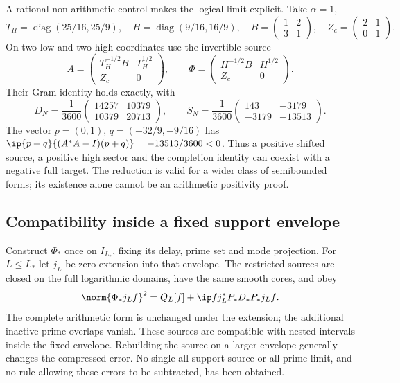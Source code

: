 A rational non-arithmetic control makes the logical limit explicit.
Take $\alpha=1$,
\[
T_H=\operatorname{diag}(25/16,25/9),\quad
H=\operatorname{diag}(9/16,16/9),\quad
B=\begin{pmatrix}1&2\\3&1\end{pmatrix},\quad
Z_c=\begin{pmatrix}2&1\\0&1\end{pmatrix}.
\]
On two low and two high coordinates use the invertible source
\[
A=\begin{pmatrix}T_H^{-1/2}B&T_H^{1/2}\\Z_c&0\end{pmatrix},
\qquad
\Phi=\begin{pmatrix}H^{-1/2}B&H^{1/2}\\Z_c&0\end{pmatrix}.
\]
Their Gram identity holds exactly, with
\[
D_N=\frac1{3600}
\begin{pmatrix}14257&10379\\10379&20713\end{pmatrix},\qquad
S_N=\frac1{3600}
\begin{pmatrix}143&-3179\\-3179&-13513\end{pmatrix}.
\]
The vector $p=(0,1)$, $q=(-32/9,-9/16)$ has
$\ip{p+q}{(A^*A-I)(p+q)}=-13513/3600<0$.
Thus a positive shifted source, a positive high sector and the
completion identity can coexist with a negative full target.
The reduction is valid for a wider class of semibounded forms;
its existence alone cannot be an arithmetic positivity proof.

\subsection{Compatibility inside a fixed support envelope}
Construct $\Phi_*$ once on $I_{L_*}$, fixing its delay, prime set
and mode projection. For $L\le L_*$ let $j_L$ be zero extension
into that envelope. The restricted sources are closed on the
full logarithmic domains, have the same smooth cores, and obey
\begin{equation}\label{joint:envelope}
\norm{\Phi_*j_Lf}^2
=Q_L[f]+\ip f{j_L^*P_*D_*P_*j_Lf}.
\end{equation}
The complete arithmetic form is unchanged under the extension;
the additional inactive prime overlaps vanish. These sources
are compatible with nested intervals inside the fixed envelope.
Rebuilding the source on a larger envelope generally changes
the compressed error. No single all-support source or all-prime
limit, and no rule allowing these errors to be subtracted, has
been obtained.
